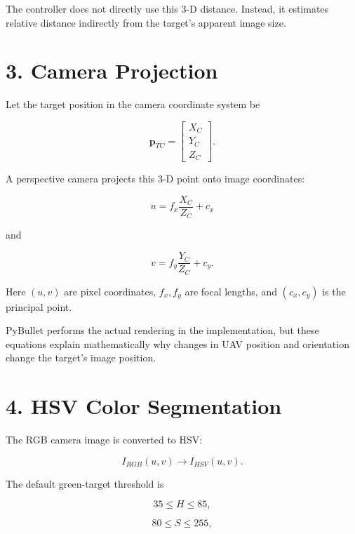 \documentclass[12pt,a4paper]{article}
\begin{document}
The controller does not directly use this 3-D distance. Instead, it estimates relative distance indirectly from the target's apparent image size.

\section{3. Camera Projection}

Let the target position in the camera coordinate system be

\begin{equation}
\mathbf{p}_{TC}=
\begin{bmatrix}
X_C\\Y_C\\Z_C
\end{bmatrix}.
\end{equation}

A perspective camera projects this 3-D point onto image coordinates:

\begin{equation}
\boxed{
u=f_x\frac{X_C}{Z_C}+c_x
}
\end{equation}

and

\begin{equation}
\boxed{
v=f_y\frac{Y_C}{Z_C}+c_y.
}
\end{equation}

Here $(u,v)$ are pixel coordinates, $f_x,f_y$ are focal lengths, and $(c_x,c_y)$ is the principal point.

PyBullet performs the actual rendering in the implementation, but these equations explain mathematically why changes in UAV position and orientation change the target's image position.

\section{4. HSV Color Segmentation}

The RGB camera image is converted to HSV:

\begin{equation}
I_{RGB}(u,v)\rightarrow I_{HSV}(u,v).
\end{equation}

The default green-target threshold is

\begin{equation}
35\leq H\leq85,
\end{equation}

\begin{equation}
80\leq S\leq255,
\end{equation}
\end{document}

